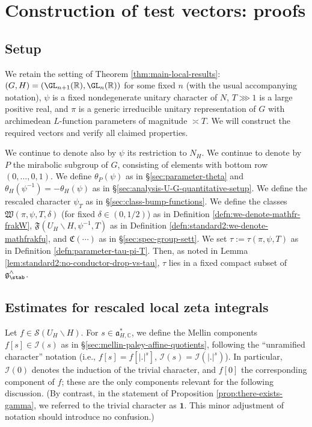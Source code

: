\section{Construction of test vectors: proofs}\label{sec:constr-test-vect-proofs}

\subsection{Setup}\label{sec:constr-test-vec-setup}
We retain the setting of Theorem \ref{thm:main-local-results}: $(G,H) = (\GL_{n+1}(\mathbb{R}),\GL_n(\mathbb{R}))$ for some fixed $n$ (with the usual accompanying notation), $\psi$ is a fixed nondegenerate unitary character of $N$, $T \ggg 1$ is a large positive real, and $\pi$ is a generic irreducible unitary representation of $G$ with archimedean $L$-function parameters of magnitude $\asymp T$.  We will construct the required vectors and verify all claimed properties.

We continue to denote also by $\psi$ its restriction to $N_H$.  We continue to denote by $P$ the mirabolic subgroup of $G$, consisting of elements with bottom row $(0,\dotsc,0,1)$.  We define $\theta_P(\psi)$ as in \S\ref{sec:parameter-theta} and $\theta_H(\psi^{-1}) = - \theta_H(\psi)$ as in \S\ref{sec:analysis-U-G-quantitative-setup}.  We define the rescaled character $\psi_T$ as in \S\ref{sec:class-bump-functions}.  We define the classes $\mathfrak{W}(\pi,\psi,T,\delta)$ (for fixed $\delta \in (0,1/2)$) as in Definition \ref{defn:we-denote-mathfr-frakW}, $\mathfrak{F}(U_H \backslash H, \psi^{-1}, T)$ as in Definition \ref{defn:standard2:we-denote-mathfrakfu}, and $\mathfrak{C}(\dotsb)$ as in \S\ref{sec:spec-group-sett}.  We set $\tau := \tau(\pi,\psi,T)$ as in Definition \ref{defn:parameter-tau-pi-T}.  Then, as noted in Lemma \ref{lem:standard2:no-conductor-drop-vs-tau}, $\tau$ lies in a fixed compact subset of $\mathfrak{g}^\wedge_{\stab}$.


\subsection{Estimates for rescaled local zeta integrals}\label{sec:estim-resc-local}
Let $f \in \mathcal{S}(U_H \backslash H)$.  For $s \in \mathfrak{a}_{H,\mathbb{C}}^*$, we define the Mellin components $f[s] \in \mathcal{I}(s)$ as in \S\ref{sec:mellin-paley-affine-quotients}, following the ``unramified character'' notation (i.e., $f[s] = f[|.|^s]$, $\mathcal{I}(s) = \mathcal{I}(|.|^s)$).  In particular, $\mathcal{I}(0)$ denotes the induction of the trivial character, and $f[0]$ the corresponding component of $f$; these are the only components relevant for the following discussion.  (By contrast, in the statement of Proposition \ref{prop:there-exists-gamma}, we referred to the trivial character as $\mathbf{1}$.  This minor adjustment of notation should introduce no confusion.)

